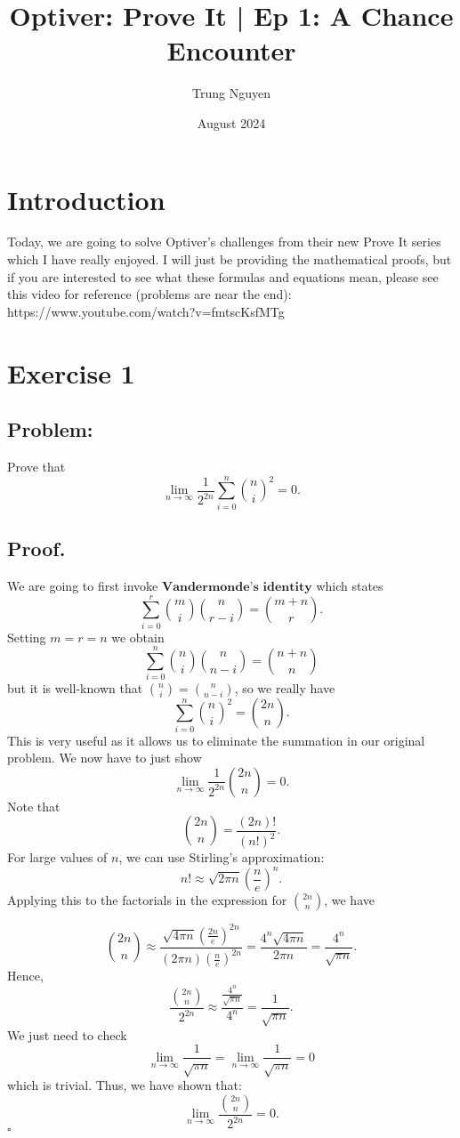 \documentclass{article}
\title{Optiver: Prove It | Ep 1: A Chance Encounter}
\author{Trung Nguyen}
\date{August 2024}
\begin{document}
\maketitle

\section{Introduction}

Today, we are going to solve Optiver's challenges from their new Prove It series which I have really enjoyed. I will just be providing the mathematical proofs, but if you are interested to see what these formulas and equations mean, please see this video for reference (problems are near the end): https://www.youtube.com/watch?v=fmtscKsfMTg 

\section{Exercise 1}

\subsection{Problem:}
Prove that $$\lim_{n\to\infty} \frac{1}{2^{2n}}\sum_{i=0}^{n} {n\choose i}^2 =0.$$

\subsection{Proof.} 
We are going to first invoke $\textbf{Vandermonde's identity}$ which states $${\displaystyle \sum _{i=0}^{r}{m \choose i}{n \choose r-i}={m+n \choose r}}.$$ Setting $m=r=n$ we obtain $${\displaystyle \sum _{i=0}^{n}{n \choose i}{n \choose n-i}={n+n \choose n}}$$ but it is well-known that ${n \choose i}={n \choose n-i}$, so we really have $$\sum_{i=0}^{n} {n\choose i}^2={2n\choose n}.$$ This is very useful as it allows us to eliminate the summation in our original problem. We now have to just show \[\lim_{n\to\infty} \frac{1}{2^{2n}}{2n\choose n} =0.\]Note that \[{2n\choose n}= \frac{(2n)!}{(n!)^2}.\] For large values of \(n\), we can use Stirling's approximation:
\[
n! \approx \sqrt{2\pi n} \left(\frac{n}{e}\right)^n.
\]Applying this to the factorials in the expression for \({2n\choose n}\), we have

\[
{2n\choose n} \approx \frac{\sqrt{4\pi n} \left(\frac{2n}{e}\right)^{2n}}{(2\pi n) \left(\frac{n}{e}\right)^{2n}} = \frac{4^n \sqrt{4\pi n}}{2\pi n} = \frac{4^n}{\sqrt{\pi n}}.
\]
Hence, 
\[
\frac{{2n\choose n}}{2^{2n}} \approx \frac{\frac{4^n}{\sqrt{\pi n}}}{4^n} = \frac{1}{\sqrt{\pi n}}.
\]We just need to check
\[
\lim_{n \to \infty} \frac{1}{\sqrt{\pi n}} = \lim_{n \to \infty} \frac{1}{\sqrt{\pi n}} = 0
\]
which is trivial. Thus, we have shown that:
\[
\lim_{n\to \infty} \frac{{2n\choose n}}{2^{2n}} = 0. 
\]
$\square$
\end{document}

